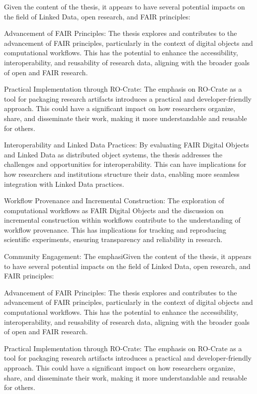 Given the content of the thesis, it appears to have several potential impacts on the field of Linked Data, open research, and FAIR principles:

    Advancement of FAIR Principles: The thesis explores and contributes to the advancement of FAIR principles, particularly in the context of digital objects and computational workflows. This has the potential to enhance the accessibility, interoperability, and reusability of research data, aligning with the broader goals of open and FAIR research.

    Practical Implementation through RO-Crate: The emphasis on RO-Crate as a tool for packaging research artifacts introduces a practical and developer-friendly approach. This could have a significant impact on how researchers organize, share, and disseminate their work, making it more understandable and reusable for others.

    Interoperability and Linked Data Practices: By evaluating FAIR Digital Objects and Linked Data as distributed object systems, the thesis addresses the challenges and opportunities for interoperability. This can have implications for how researchers and institutions structure their data, enabling more seamless integration with Linked Data practices.

    Workflow Provenance and Incremental Construction: The exploration of computational workflows as FAIR Digital Objects and the discussion on incremental construction within workflows contribute to the understanding of workflow provenance. This has implications for tracking and reproducing scientific experiments, ensuring transparency and reliability in research.

    Community Engagement: The emphasiGiven the content of the thesis, it appears to have several potential impacts on the field of Linked Data, open research, and FAIR principles:

    Advancement of FAIR Principles: The thesis explores and contributes to the advancement of FAIR principles, particularly in the context of digital objects and computational workflows. This has the potential to enhance the accessibility, interoperability, and reusability of research data, aligning with the broader goals of open and FAIR research.

    Practical Implementation through RO-Crate: The emphasis on RO-Crate as a tool for packaging research artifacts introduces a practical and developer-friendly approach. This could have a significant impact on how researchers organize, share, and disseminate their work, making it more understandable and reusable for others.

